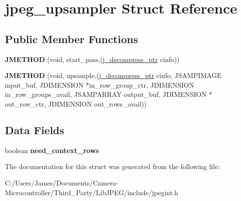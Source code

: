 \hypertarget{structjpeg__upsampler}{}\section{jpeg\+\_\+upsampler Struct Reference}
\label{structjpeg__upsampler}
\subsection*{Public Member Functions}
\begin{DoxyCompactItemize}
\item 
\mbox{\label{structjpeg__upsampler_a49e08839ba93659b8c4dae80ec9f4252}} 
{\bfseries J\+M\+E\+T\+H\+OD} (void, start\+\_\+pass,(\hyperlink{structjpeg__decompress__struct}{j\+\_\+decompress\+\_\+ptr} cinfo))
\item 
\mbox{\label{structjpeg__upsampler_afdf221416fc6c6089828ae9a65753646}} 
{\bfseries J\+M\+E\+T\+H\+OD} (void, upsample,(\hyperlink{structjpeg__decompress__struct}{j\+\_\+decompress\+\_\+ptr} cinfo, J\+S\+A\+M\+P\+I\+M\+A\+GE input\+\_\+buf, J\+D\+I\+M\+E\+N\+S\+I\+ON $\ast$in\+\_\+row\+\_\+group\+\_\+ctr, J\+D\+I\+M\+E\+N\+S\+I\+ON in\+\_\+row\+\_\+groups\+\_\+avail, J\+S\+A\+M\+P\+A\+R\+R\+AY output\+\_\+buf, J\+D\+I\+M\+E\+N\+S\+I\+ON $\ast$out\+\_\+row\+\_\+ctr, J\+D\+I\+M\+E\+N\+S\+I\+ON out\+\_\+rows\+\_\+avail))
\end{DoxyCompactItemize}
\subsection*{Data Fields}
\begin{DoxyCompactItemize}
\item 
\mbox{\label{structjpeg__upsampler_ad52e3e87172ede3b59aaf3cfcf736592}} 
boolean {\bfseries need\+\_\+context\+\_\+rows}
\end{DoxyCompactItemize}


The documentation for this struct was generated from the following file\+:\begin{DoxyCompactItemize}
\item 
C\+:/\+Users/\+James/\+Documents/\+Camera-\/\+Microcontroller/\+Third\+\_\+\+Party/\+Lib\+J\+P\+E\+G/include/jpegint.\+h\end{DoxyCompactItemize}
